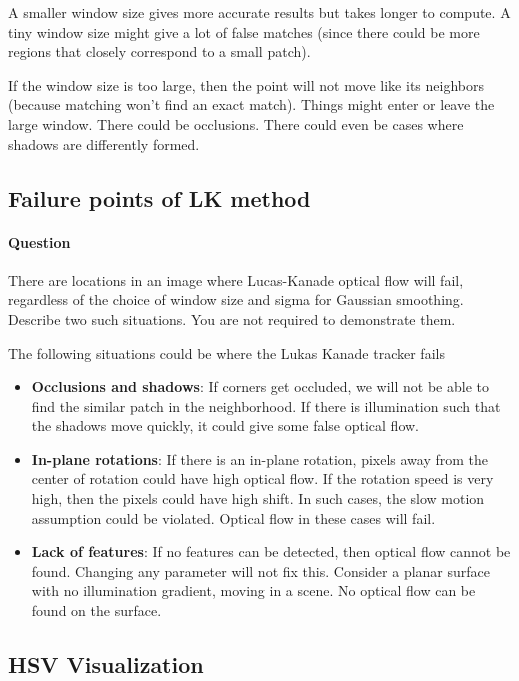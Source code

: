A smaller window size gives more accurate results but takes longer to compute. A tiny window size might give a lot of false matches (since there could be more regions that closely correspond to a small patch).

If the window size is too large, then the point will not move like its neighbors (because matching won't find an exact match). Things might enter or leave the large window. There could be occlusions. There could even be cases where shadows are differently formed.

\subsection{Failure points of LK method}

\paragraph*{Question}
\begin{displayquote}
    There are locations in an image where Lucas-Kanade optical flow will fail, regardless of the choice of window size and sigma for Gaussian smoothing. Describe two such situations. You are not required to demonstrate them.
\end{displayquote}

The following situations could be where the Lukas Kanade tracker fails

\begin{itemize}
    \item \textbf{Occlusions and shadows}: If corners get occluded, we will not be able to find the similar patch in the neighborhood. If there is illumination such that the shadows move quickly, it could give some false optical flow.
    \item \textbf{In-plane rotations}: If there is an in-plane rotation, pixels away from the center of rotation could have high optical flow. If the rotation speed is very high, then the pixels could have high shift. In such cases, the slow motion assumption could be violated. Optical flow in these cases will fail.
    \item \textbf{Lack of features}: If no features can be detected, then optical flow cannot be found. Changing any parameter will not fix this. Consider a planar surface with no illumination gradient, moving in a scene. No optical flow can be found on the surface.
\end{itemize}

\subsection{HSV Visualization}

